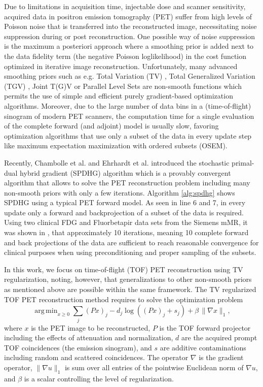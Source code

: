 \documentclass[11pt,twocolumn,twoside]{article}
\DeclareMathOperator*{\argmin}{arg\,min}
\begin{document}
Due to limitations in acquisition time, injectable dose and scanner sensitivity,
acquired data in positron emission tomography (PET) suffer from high levels of
Poisson noise that is transferred into the reconstructed image, necessitating
noise suppression during or post reconstruction.
One possible way of noise suppression is the maximum a posteriori approach
where a smoothing prior is added next to the data fidelity term (the negative
Poisson loglikelihood) in the cost function optimized in iterative image 
reconstruction.
Unfortunately, many advanced smoothing priors such as e.g. Total Variation (TV) \cite{Rudin1992},
Total Generalized Variation (TGV) \cite{Bredies2010}, Joint T(G)V \cite{Rigie2015,Knoll2017}
or Parallel Level Sets \cite{Ehrhardt2016a,Schramm2017} are non-smooth 
functions which permits the use of simple and efficient purely gradient-based
optimization algorithms.
Moreover, due to the large number of data bins in a (time-of-flight) sinogram
of modern PET scanners, the computation time for a single evaluation of the complete
forward (and adjoint) model is usually slow, favoring optimization algorithms that
use only a subset of the data in every update step like maximum expectation maximization
with ordered subsets (OSEM).

Recently, Chambolle et al. \cite{Chambolle2018} and  Ehrhardt et al. \cite{Ehrhardt2019} introduced 
the stochastic primal-dual hybrid gradient (SPDHG) algorithm which is a provably convergent algorithm
that allows to solve the PET reconstruction problem including many non-smooth priors with
only a few iterations. 
Algorithm \ref{alg:spdhg} shows SPDHG using a typical PET forward model.
As seen in line 6 and 7, in every update only a forward and backprojection of a subset
of the data is required.
Using two clinical FDG and Fluorbetapir data sets from the Siemens mMR, 
it was shown in \cite{Ehrhardt2019}, that approximately 10 iterations, meaning 10 complete 
forward and back projections of the data are sufficient to reach reasonable convergence
for clinical purposes when using preconditioning and proper sampling of the subsets.

In this work, we focus on time-of-flight (TOF) PET reconstruction 
using TV regularization, noting, however, that generalizations to other non-smooth priors as mentioned above are possible within the same framework. The TV regularized TOF PET reconstruction method requires to solve the optimization problem
%
\begin{equation}
\argmin _{x\geq 0} \sum_j (Px)_j -  d_j \log \left( (Px)_ j + s_j \right) + \beta \, \|\nabla x\|_{1},
\end{equation}
%
where $x$ is the PET image to be reconstructed, $P$ is the TOF forward projector including the effects
of attenuation and normalization, $d$ are the acquired prompt TOF coincidences (the emission sinogram),
and $s$ are additive contaminations including random and scattered coincidences. The operator $\nabla$ is the gradient operator, $\|\nabla u \|_1$ is sum over all entries of the pointwise Euclidean norm of $\nabla u$, and $\beta$ is a scalar controlling the level of regularization.
\end{document}
